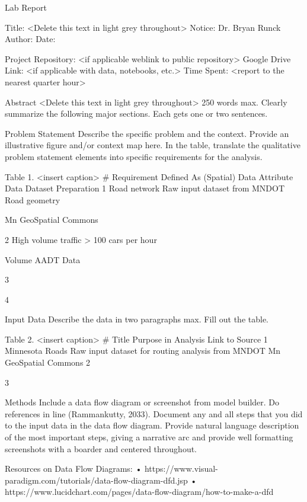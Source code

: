 Lab Report

Title: <Delete this text in light grey throughout>
Notice: Dr. Bryan Runck
Author:
Date:

Project Repository: <if applicable weblink to public repository>
Google Drive Link: <if applicable with data, notebooks, etc.>
Time Spent: <report to the nearest quarter hour>

Abstract
<Delete this text in light grey throughout>
250 words max. Clearly summarize the following major sections. Each gets one or two sentences.  


Problem Statement
Describe the specific problem and the context. Provide an illustrative figure and/or context map here. In the table, translate the qualitative problem statement elements into specific requirements for the analysis.


Table 1. <insert caption>
#
Requirement
Defined As
(Spatial) Data
Attribute Data
Dataset
Preparation
1
Road network
Raw input dataset from MNDOT
Road geometry

Mn GeoSpatial Commons

2
High volume traffic
> 100 cars per hour

Volume
AADT Data

3






4









Input Data
Describe the data in two paragraphs max. Fill out the table.

Table 2. <insert caption>
#
Title
Purpose in Analysis
Link to Source
1
Minnesota Roads
Raw input dataset for routing analysis from MNDOT
Mn GeoSpatial Commons
2



3









Methods
Include a data flow diagram or screenshot from model builder. Do references in line (Rammankutty, 2033). Document any and all steps that you did to the input data in the data flow diagram. Provide natural language description of the most important steps, giving a narrative arc and provide well formatting screenshots with a boarder and centered throughout.

Resources on Data Flow Diagrams:
• https://www.visual-paradigm.com/tutorials/data-flow-diagram-dfd.jsp
• https://www.lucidchart.com/pages/data-flow-diagram/how-to-make-a-dfd

